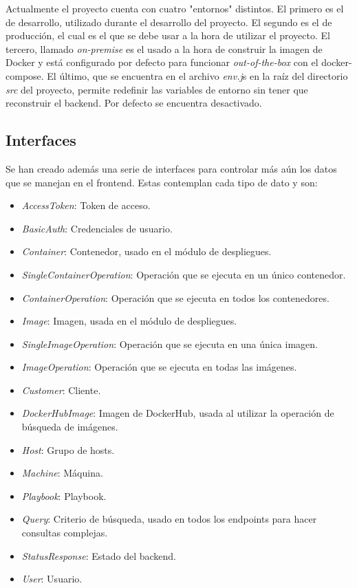 \bigskip
Actualmente el proyecto cuenta con cuatro "entornos" distintos. El primero es el de desarrollo, utilizado durante el desarrollo del proyecto. El segundo es el de producción, el cual es el que se debe usar a la hora de utilizar el proyecto. El tercero, llamado \textit{on-premise} es el usado a la hora de construir la imagen de Docker y está configurado por defecto para funcionar \textit{out-of-the-box} con el docker-compose. El último, que se encuentra en el archivo \textit{env.j}s en la raíz del directorio \textit{src} del proyecto, permite redefinir las variables de entorno sin tener que reconstruir el backend. Por defecto se encuentra desactivado.


\subsection{Interfaces}


Se han creado además una serie de interfaces para controlar más aún los datos que se manejan en el frontend. Estas contemplan cada tipo de dato y son:
\begin{itemize}
	\item \textit{AccessToken}: Token de acceso.
	\item \textit{BasicAuth}: Credenciales de usuario.
	\item \textit{Container}: Contenedor, usado en el módulo de despliegues.
	\item \textit{SingleContainerOperation}: Operación que se ejecuta en un único contenedor.
	\item \textit{ContainerOperation}: Operación que se ejecuta en todos los contenedores.
	\item \textit{Image}: Imagen, usada en el módulo de despliegues.
	\item \textit{SingleImageOperation}: Operación que se ejecuta en una única imagen.
	\item \textit{ImageOperation}: Operación que se ejecuta en todas las imágenes.
	\item \textit{Customer}: Cliente.
	\item \textit{DockerHubImage}: Imagen de DockerHub, usada al utilizar la operación de búsqueda de imágenes.
	\item \textit{Host}: Grupo de hosts.
	\item \textit{Machine}: Máquina.
	\item \textit{Playbook}: Playbook.
	\item \textit{Query}: Criterio de búsqueda, usado en todos los endpoints para hacer consultas complejas.
	\item \textit{StatusResponse}: Estado del backend.
	\item \textit{User}: Usuario.
\end{itemize}



